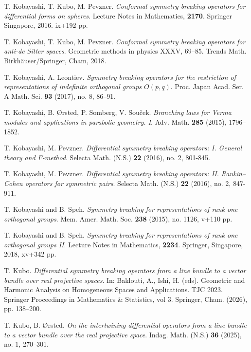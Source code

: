 \documentclass[12pt, pdflatex, a4paper]{article}
\theoremstyle{plain}
\theoremstyle{definition}
\begin{document}
\begin{thebibliography}{}
T. Kobayashi, T. Kubo, M. Pevzner.
\textit{Conformal symmetry breaking operators for differential forms on spheres}.
Lecture Notes in Mathematics, \textbf{2170}.
Springer Singapore, 2016. ix+192 pp.

T. Kobayashi, T. Kubo, M. Pevzner.
\textit{Conformal symmetry breaking operators for anti-de Sitter spaces}.
Geometric methods in physics XXXV, 69–85.
Trends Math.
Birkhäuser/Springer, Cham, 2018.

T. Kobayashi, A. Leontiev.
\textit{Symmetry breaking operators for the restriction of representations of indefinite orthogonal groups $O(p,q)$}.
Proc. Japan Acad. Ser. A Math. Sci. \textbf{93} (2017), no. 8, 86–91.


T. Kobayashi, B. \O rsted, P. Somberg, V. Sou\v{c}ek.
\textit{Branching laws for Verma modules and applications in parabolic geometry. I}.
Adv. Math. \textbf{285} (2015), 1796--1852.

T. Kobayashi, M. Pevzner.
\textit{Differential symmetry breaking operators: I. General theory and F-method}. 
Selecta Math. (N.S.) \textbf{22} (2016), no. 2, 801-845.

T. Kobayashi, M. Pevzner.
\textit{Differential symmetry breaking operators: II. Rankin--Cohen operators for symmetric pairs}. 
Selecta Math. (N.S.) \textbf{22} (2016), no. 2, 847-911.

T. Kobayashi and B. Speh.
\textit{Symmetry breaking for representations of rank one orthogonal groups}.
Mem. Amer. Math. Soc. \textbf{238} (2015), no. 1126, v+110 pp.

T. Kobayashi and B. Speh.
\textit{Symmetry breaking for representations of rank one orthogonal groups II}.
Lecture Notes in Mathematics, \textbf{2234}. Springer, Singapore, 2018, xv+342 pp.

T. Kubo.
\textit{Differential symmetry breaking operators from a line bundle to a vector bundle over real projective spaces}. In: Baklouti, A., Ishi, H. (eds). Geometric and Harmonic Analysis on Homogeneous Spaces and Applications. TJC 2023. Springer Proceedings in Mathematics \& Statistics, vol 3. Springer, Cham. (2026), pp. 138--200.

T. Kubo, B. \O rsted.
\textit{On the intertwining differential operators from a line bundle to a vector bundle over the real projective space}. Indag. Math. (N.S.) \textbf{36} (2025), no. 1, 270--301.


\end{thebibliography}
\end{document}
